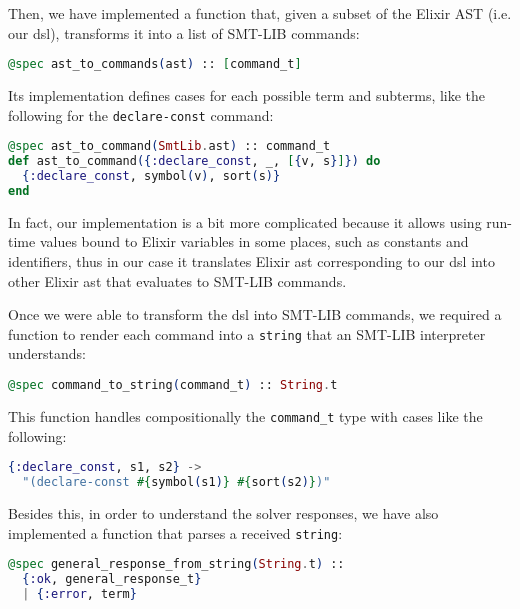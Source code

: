 Then, we have implemented a function that, given a subset of the Elixir AST
(i.e. our \gls{dsl}), transforms it into a list of SMT-LIB commands:

\begin{lstlisting}[language=elixir,numbers=none,frame=none]
@spec ast_to_commands(ast) :: [command_t]
\end{lstlisting}

Its implementation defines cases for each possible term and subterms, like the
following for the \verb|declare-const| command:

\begin{lstlisting}[language=elixir,numbers=none,frame=none]
@spec ast_to_command(SmtLib.ast) :: command_t
def ast_to_command({:declare_const, _, [{v, s}]}) do
  {:declare_const, symbol(v), sort(s)}
end
\end{lstlisting}

In fact, our implementation is a bit more complicated because it allows using 
run-time values bound to Elixir variables in some places, such as constants and
identifiers, thus in our case it translates Elixir \gls{ast} corresponding to
our \gls{dsl} into other Elixir \gls{ast} that evaluates to SMT-LIB commands.

Once we were able to transform the \gls{dsl} into SMT-LIB commands, we required
a function to render each command into a \verb|string| that an SMT-LIB
interpreter understands:

\begin{lstlisting}[language=elixir,numbers=none,frame=none]
@spec command_to_string(command_t) :: String.t
\end{lstlisting}

This function handles compositionally the \verb|command_t| type with cases like
the following:

\begin{lstlisting}[language=elixir,numbers=none,frame=none]
{:declare_const, s1, s2} ->
  "(declare-const #{symbol(s1)} #{sort(s2)})"
\end{lstlisting}

Besides this, in order to understand the solver responses, we have also
implemented a function that parses a received \verb|string|:

\begin{lstlisting}[language=elixir,numbers=none,frame=none]
@spec general_response_from_string(String.t) :: 
  {:ok, general_response_t} 
  | {:error, term}
\end{lstlisting}

